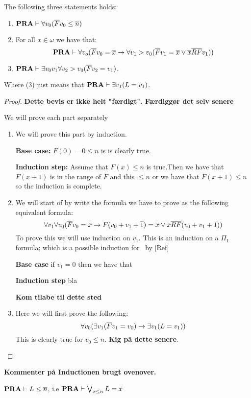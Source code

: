 \documentclass[../main.tex]{subfiles}
\begin{document}
\begin{lem}
	\label{lem:2}
	The following three statements holds:
	\begin{enumerate}
		\item $\text{\textbf{PRA}}\vdash\forall v_0(\overline Fv_0\leq \overline n)$
		\item For all $x\in\omega$ we have that:\ $$\text{\textbf{PRA}}\vdash\forall
			v_o(\overline
			Fv_0=\overline x\rightarrow\forall v_1>v_0(\overline Fv_1=\overline x\vee
			\overline x\overline R\overline Fv_1))$$
		\item $\text{\textbf{PRA}}\vdash\exists v_0v_1\forall v_2>v_0(\overline Fv_2=v_1)$. 
	\end{enumerate}
	Where (3) just means that $\text{\textbf{PRA}}\vdash\exists v_1(L=v_1)$.
\end{lem}
\begin{proof}
	\textbf{Dette bevis er ikke helt "færdigt". Færdiggør det selv senere}

	We will prove each part separately 

	\begin{enumerate}

		\item We will prove this part by induction.

			\textbf{Base case:} $F(0)=0\leq n$ is is clearly true.

			\textbf{Induction step:} Assume that $F(x)\leq n$ is
			true.Then we have that $F(x+1)$ is in the range of $F$
			and this $\leq n$ or we have that $F(x+1)\leq n$ so the
			induction is complete.
		\item We will start of by write the formula we have to prove as
			the following equivalent formula:
			$$\forall v_1\forall v_0(\overline{F}v_0=\overline x\rightarrow
			F(v_0 + v_1+\overline 1)=\overline x\vee \overline x\overline R\overline
			F(v_0+v_1+1))$$
			To prove this we will use induction on $v_1$. This is
			an induction on a $\Pi_1$ formula; which is a possible
			induction for \PRA\ by [Ref] 

			\textbf{Base case} if $v_1=0$ then we have that 

			\textbf{Induction step} bla

			\textbf{Kom tilabe til dette sted}

		\item Here we will first prove the following:
			$$\forall v_0(\exists v_1(\overline
			Fv_1=v_0)\rightarrow\exists v_1(L=v_1))$$
			This is clearly true for $v_0\leq n$. \textbf{Kig på
			dette senere}.
\end{enumerate}
\end{proof}
\textbf{Kommenter på Inductionen brugt ovenover.}
\begin{cor}
	$\text{\textbf{PRA}}\vdash L\leq \overline n$, i.e $\text{\textbf{PRA}}\vdash \bigvee_{x\leq n} L=\overline x$
\end{cor}
\end{document}
